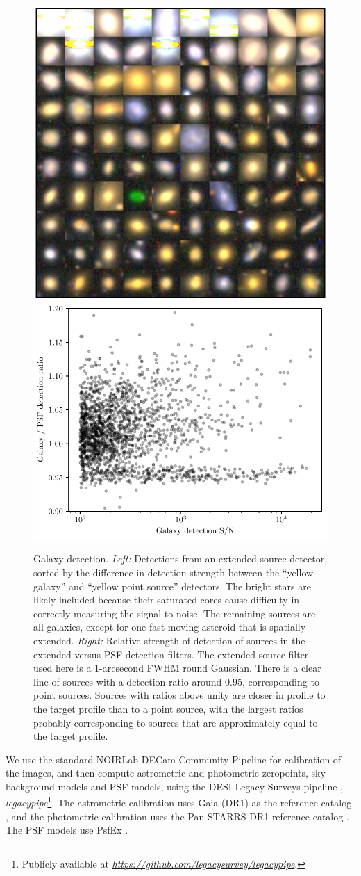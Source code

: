 \documentclass[11pt,letterpaper,linenumbers]{aastex63}
\newcommand{\niceurl}[1]{\mbox{\href{#1}{\textsl{#1}}}}
\begin{document}
\begin{figure}[p!]
  \begin{center}
    \includegraphics[height=0.4\textwidth]{galaxies}
    \includegraphics[height=0.4\textwidth]{galaxies-relsn}
    \caption{Galaxy detection.  \emph{Left:} Detections from an extended-source detector,
      sorted by the difference in detection strength between the
      ``yellow galaxy'' and ``yellow point source'' detectors.  The
      bright stars are likely included because their saturated cores
      cause difficulty in correctly measuring the signal-to-noise.
      The remaining sources are all galaxies, except for one
      fast-moving asteroid that is spatially extended.  \emph{Right:}
      Relative strength of detection of sources in the extended versus
      PSF detection filters.  The extended-source filter used here is
      a 1-arcsecond FWHM round Gaussian.  There is a clear line of
      sources with a detection ratio around 0.95, corresponding to
      point sources.  Sources with ratios above unity are closer in
      profile to the target profile than to a point source, with the
      largest ratios probably corresponding to sources that are
      approximately equal to the target profile.
      \label{fig:gals}}
  \end{center}
\end{figure}

We use the standard NOIRLab DECam Community Pipeline \citep{cppipeline}
for calibration of the images, and then compute astrometric and
photometric zeropoints, sky background models and PSF models, using
the DESI Legacy Surveys pipeline \citep{lsoverview},
\textsl{legacypipe}\footnote{Publicly available at
  \niceurl{https://github.com/legacysurvey/legacypipe}.}.
The astrometric
calibration uses Gaia (DR1) as the reference catalog \citep{gaia,
  gaiaDR1}, and the photometric calibration uses the Pan-STARRS DR1
reference catalog \citep{panstarrs}.  The PSF models use PsfEx
\citep{psfex}.
\end{document}

